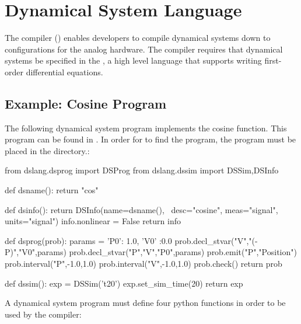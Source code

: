 \chapter{Dynamical System Language}
\label{sec:dslang}
The \legno compiler () enables developers to compile dynamical
systems down to configurations for the analog hardware. The \legno compiler
requires that dynamical systems be specified in the , a high level language that supports writing first-order
differential equations.

\section{Example: Cosine Program}

The following dynamical system program implements the cosine function. This
program can be found in . In order for 
to find the program, the program must be placed in the  directory.:
\begin{dssnippet}

from dslang.dsprog import DSProg
from dslang.dssim import DSSim,DSInfo

def dsname():
  return "cos"

def dsinfo():
  return DSInfo(name=dsname(), \
                desc="cosine",
                meas="signal",
                units="signal")
  info.nonlinear = False
  return info

def dsprog(prob):
  params = {
    'P0': 1.0,
    'V0' :0.0
  }
  prob.decl_stvar("V","(-P)","{V0}",params)
  prob.decl_stvar("P","V","{P0}",params)
  prob.emit("P","Position")
  prob.interval("P",-1.0,1.0)
  prob.interval("V",-1.0,1.0)
  prob.check()
  return prob

def dssim():
  exp = DSSim('t20')
  exp.set_sim_time(20)
  return exp
  
\end{dssnippet}

\noindent A dynamical system program must define four python functions in order to be used
by the compiler:

